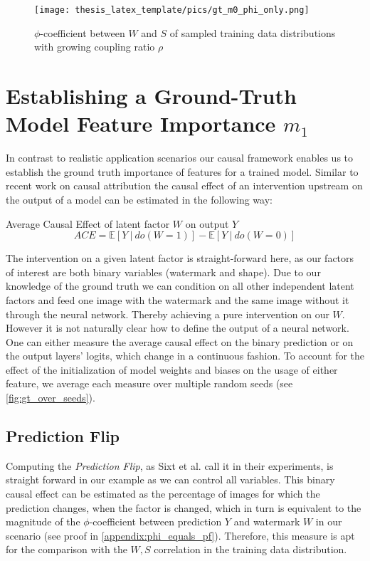 \begin{figure}[t!]
    \centering
    \texttt{[image: thesis\_latex\_template/pics/gt\_m0\_phi\_only.png]}
    \caption[True Data Distribution $m_0$]{$\phi$-coefficient between $W$ and $S$ of sampled training data distributions with growing coupling ratio $\rho$}
    \label{fig:finding_rho}
\end{figure}

\section{Establishing a Ground-Truth Model Feature Importance $m_1$}\label{section:gt_measure}
In contrast to realistic application scenarios our causal framework enables us to establish the ground truth importance of features for a trained model. Similar to recent work on causal attribution \cite{Goyal2019,Parafita2019,Karimi2023} the causal effect of an intervention upstream on the output of a model can be estimated in the following way:
\begin{center}
Average Causal Effect of latent factor $W$ on output $Y$ \\
\begin{equation}
\displaystyle ACE = \mathbb{E} [ Y \ | \ do(W=1) ] - \mathbb{E} [ Y \ | \ do(W=0) ] 
\end{equation}
\end{center}

The intervention on a given latent factor is straight-forward here, as our factors of interest are both binary variables (watermark and shape). Due to our knowledge of the ground truth we can condition on all other independent latent factors and feed one image with the watermark and the same image without it through the neural network. Thereby achieving a pure intervention on our $W$.  
However it is not naturally clear how to define the output of a neural network. One can either measure the average causal effect on the binary prediction or on the output layers' logits, which change in a continuous fashion.
To account for the effect of the initialization of model weights and biases on the usage of either feature, we average each measure over multiple random seeds (see \cref{fig:gt_over_seeds}).

\subsection{Prediction Flip}
Computing the \textit{Prediction Flip}, as Sixt et al. \cite{Sixt2022a} call it in their experiments, is straight forward in our example as we can control all variables. 
This binary causal effect can be estimated as the percentage of images for which the prediction changes, when the factor is changed, which in turn is equivalent to the magnitude of the $\phi$-coefficient between prediction $Y$ and watermark $W$ in our scenario (see proof in \cref{appendix:phi_equals_pf}). Therefore, this measure is apt for the comparison with the $W,S$ correlation in the training data distribution.

